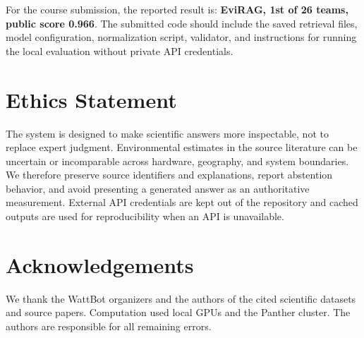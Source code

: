 \documentclass[11pt]{article}
\begin{document}
For the course submission, the reported result is: \textbf{EviRAG, 1st of 26 teams, public score 0.966}. The submitted code should include the saved retrieval files, model configuration, normalization script, validator, and instructions for running the local evaluation without private API credentials.

\section*{Ethics Statement}
The system is designed to make scientific answers more inspectable, not to replace expert judgment. Environmental estimates in the source literature can be uncertain or incomparable across hardware, geography, and system boundaries. We therefore preserve source identifiers and explanations, report abstention behavior, and avoid presenting a generated answer as an authoritative measurement. External API credentials are kept out of the repository and cached outputs are used for reproducibility when an API is unavailable.

\section*{Acknowledgements}
We thank the WattBot organizers and the authors of the cited scientific datasets and source papers. Computation used local GPUs and the Panther cluster. The authors are responsible for all remaining errors.



\end{document}

